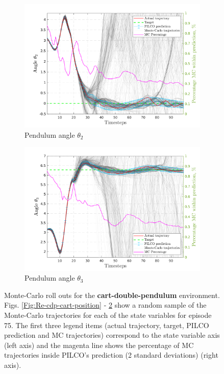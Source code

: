 \begin{figure}[htp!]
    \vspace{4ex}
  \begin{subfigure}[b]{0.48\linewidth}
    \centering
    \includegraphics[height=0.22\textheight,width=1\textwidth]{Chapter3/Figures/cdp_MC_rollout_Ep_75_Dim_5.png} 
    \caption{Pendulum angle $\theta_2$} 
    \label{Fig:Re-cdp-angle2} 
  \end{subfigure}
  \hspace{\fill}
  \begin{subfigure}[b]{0.48\linewidth}
    \centering
    \includegraphics[height=0.22\textheight,width=1\textwidth]{Chapter3/Figures/cdp_MC_rollout_Ep_75_Dim_6.png} 
    \caption{Pendulum angle $\theta_3$} 
    \label{Fig:Re-cdp-angle3} 
  \end{subfigure} 
\caption[Monte-Carlo roll outs for \textbf{cart-double-pendulum} environment]{Monte-Carlo roll outs for the \textbf{cart-double-pendulum} environment. Figs. \ref{Fig:Re-cdp-cart-position} - \ref{Fig:Re-cdp-angle3} show a random sample of the Monte-Carlo trajectories for each of the state variables for episode 75. The first three legend items (actual trajectory, target, PILCO prediction and MC trajectories) correspond to the state variable axis (left axis) and the magenta line shows the percentage of MC trajectories inside PILCO's prediction (2 standard deviations) (right axis).}
\label{Fig:Re-CartDoublePen-MC-Rollouts} 
\end{figure}



